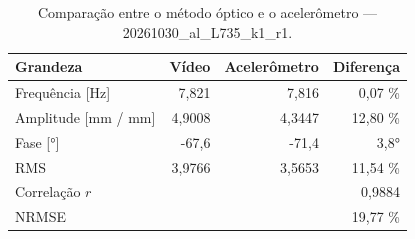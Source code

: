 \begin{table}[htbp]
  \centering
  \caption{Comparação entre o método óptico e o acelerômetro — 20261030\_al\_L735\_k1\_r1.}
  \label{tab:comp_20261030_al_L735_k1_r1}
  \begin{tabular}{lrrr}
    \toprule
    Grandeza & Vídeo & Acelerômetro & Diferença \\
    \midrule
    Frequência [Hz] & 7{,}821 & 7{,}816 & 0{,}07 \% \\
    Amplitude [mm / mm] & 4{,}9008 & 4{,}3447 & 12{,}80 \% \\
    Fase [°] & -67{,}6 & -71{,}4 & 3{,}8° \\
    RMS & 3{,}9766 & 3{,}5653 & 11{,}54 \% \\
    Correlação $r$ &  &  & 0{,}9884 \\
    NRMSE &  &  & 19{,}77 \% \\
    \bottomrule
  \end{tabular}
\end{table}
